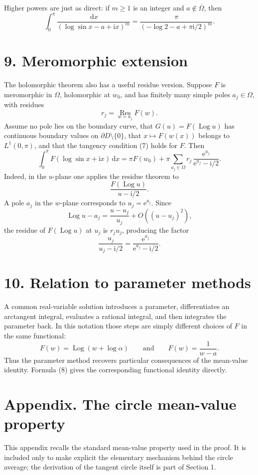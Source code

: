 \documentclass[12pt]{article}
\newcommand{\dd}{\,\mathrm{d}}
\newcommand{\ii}{\mathrm{i}}
\newcommand{\e}{\mathrm{e}}
\newcommand{\Log}{\operatorname{Log}}
\newcommand{\res}{\operatorname*{Res}}
\begin{document}
Higher powers are just as direct: if \(m\ge1\) is an integer and
\(a\notin\overline\Omega\), then
\[
\boxed{\displaystyle
\int_0^\pi
\frac{\dd x}{(\log\sin x-a+\ii x)^m}
=
\frac{\pi}{(-\log2-a+\pi\ii/2)^m}.}
\tag{24}
\]

\section*{9. Meromorphic extension}

The holomorphic theorem also has a useful residue version. Suppose \(F\) is
meromorphic in \(\Omega\), holomorphic at \(w_0\), and has finitely many
simple poles \(a_j\in\Omega\), with residues
\[
r_j=\res_{w=a_j}F(w).
\]
Assume no pole lies on the boundary curve, that
\(G(u)=F(\Log u)\) has continuous boundary values on
\(\partial D\setminus\{0\}\), that
\(x\mapsto F(w(x))\) belongs to \(L^1(0,\pi)\), and that the tangency
condition (7) holds for \(F\). Then
\[
\boxed{\displaystyle
\int_0^\pi F(\log\sin x+\ii x)\dd x
=
\pi F(w_0)
+\pi\sum_{a_j\in\Omega}
r_j\,\frac{\e^{a_j}}{\e^{a_j}-\ii/2}.}
\tag{25}
\]
Indeed, in the \(u\)-plane one applies the residue theorem to
\[
\frac{F(\Log u)}{u-\ii/2}.
\]
A pole \(a_j\) in the \(w\)-plane corresponds to \(u_j=\e^{a_j}\). Since
\[
\Log u-a_j=\frac{u-u_j}{u_j}+O((u-u_j)^2),
\]
the residue of \(F(\Log u)\) at \(u_j\) is \(r_j u_j\), producing the
factor
\[
\frac{u_j}{u_j-\ii/2}
=
\frac{\e^{a_j}}{\e^{a_j}-\ii/2}.
\]

\section*{10. Relation to parameter methods}

A common real-variable solution introduces a parameter, differentiates an
arctangent integral, evaluates a rational integral, and then integrates the
parameter back. In this notation those steps are simply different choices
of \(F\) in the same functional:
\[
F(w)=\Log(w+\log\alpha)
\qquad\text{and}\qquad
F(w)=\frac1{w-a}.
\]
Thus the parameter method recovers particular consequences of the
mean-value identity. Formula (8) gives the corresponding functional
identity directly.

\section*{Appendix. The circle mean-value property}

This appendix recalls the standard mean-value property used in the proof.
It is included only to make explicit the elementary mechanism behind the
circle average; the derivation of the tangent circle itself is part of
Section 1.
\end{document}
